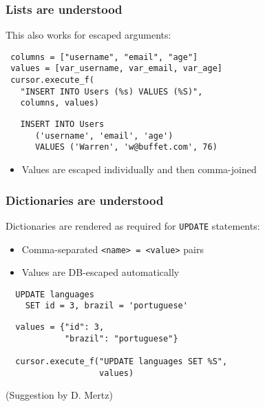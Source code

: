 \documentclass{beamer}
\begin{document}
\begin{frame}[fragile]
  \frametitle{Lists are understood}

  This also works for escaped arguments:
\begin{verbatim}
 columns = ["username", "email", "age"]
 values = [var_username, var_email, var_age]
 cursor.execute_f(
   "INSERT INTO Users (%s) VALUES (%S)",
   columns, values)
\end{verbatim}

\vfill
\begin{verbatim}
   INSERT INTO Users 
      ('username', 'email', 'age') 
      VALUES ('Warren', 'w@buffet.com', 76)
\end{verbatim}
\vfill

\begin{itemize}
\item Values are escaped individually and then comma-joined
\end{itemize}

\end{frame}


\begin{frame}[fragile]
  \frametitle{Dictionaries are understood}

  Dictionaries are rendered as required for \texttt{UPDATE} statements:
  \begin{itemize}
  \item Comma-separated \texttt{<name> = <value>} pairs
  \item Values are DB-escaped automatically
  \end{itemize}

\begin{verbatim}
  UPDATE languages 
    SET id = 3, brazil = 'portuguese'
\end{verbatim}
\vfill

\begin{verbatim}
  values = {"id": 3, 
            "brazil": "portuguese"}

  cursor.execute_f("UPDATE languages SET %S", 
                   values)
\end{verbatim}
\vfill


(Suggestion by D. Mertz)

\end{frame}
\end{document}
